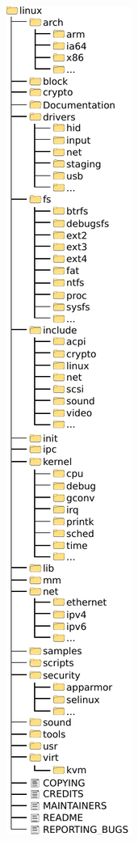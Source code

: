 \hfill
\begin{minipage}{0.18\textwidth}
   \includegraphics[width=\textwidth]{images/linux_source}
\end{minipage}

